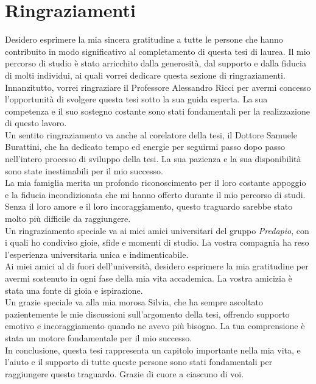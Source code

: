 \chapter*{Ringraziamenti}

Desidero esprimere la mia sincera gratitudine a tutte le persone che hanno contribuito in modo significativo al completamento di questa tesi di laurea. Il mio percorso di studio è 
stato arricchito dalla generosità, dal supporto e dalla fiducia di molti individui, ai quali vorrei dedicare questa sezione di ringraziamenti.\\
\newline
Innanzitutto, vorrei ringraziare il Professore Alessandro Ricci per avermi concesso l'opportunità di svolgere questa tesi sotto la sua guida esperta. La sua competenza e il suo 
sostegno costante sono stati fondamentali per la realizzazione di questo lavoro.\\
\newline
Un sentito ringraziamento va anche al corelatore della tesi, il Dottore Samuele Burattini, che ha dedicato tempo ed energie per seguirmi passo dopo passo nell'intero processo di
sviluppo della tesi. La sua pazienza e la sua disponibilità sono state inestimabili per il mio successo.\\
\newline
La mia famiglia merita un profondo riconoscimento per il loro costante appoggio e la fiducia incondizionata che mi hanno offerto durante il mio percorso di studi.
Senza il loro amore e il loro incoraggiamento, questo traguardo sarebbe stato molto più difficile da raggiungere.\\
\newline
Un ringraziamento speciale va ai miei amici universitari del gruppo \textit{Predapio}, con i quali ho condiviso gioie, sfide e momenti di studio. La vostra compagnia ha reso 
l'esperienza universitaria unica e indimenticabile.\\
\newline
Ai miei amici al di fuori dell'università, desidero esprimere la mia gratitudine per avermi sostenuto in ogni fase della mia vita accademica. La vostra amicizia è stata una fonte
di gioia e ispirazione.\\
\newline
Un grazie speciale va alla mia morosa Silvia, che ha sempre ascoltato pazientemente le mie discussioni sull'argomento della tesi, offrendo supporto emotivo e incoraggiamento
quando ne avevo più bisogno. La tua comprensione è stata un motore fondamentale per il mio successo.\\
\newline
In conclusione, questa tesi rappresenta un capitolo importante nella mia vita, e l'aiuto e il supporto di tutte queste persone sono stati fondamentali per raggiungere questo traguardo. 
Grazie di cuore a ciascuno di voi.





